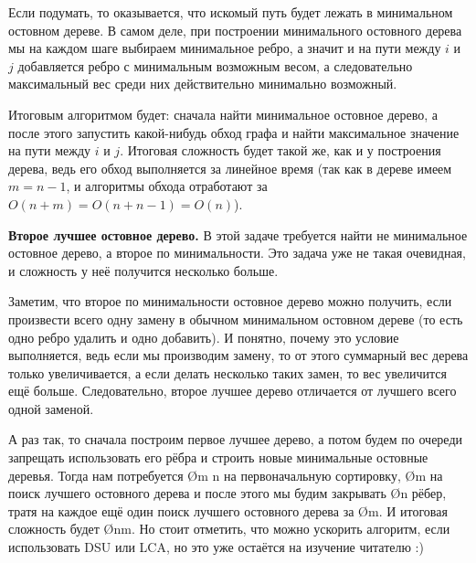 Если подумать, то оказывается, что искомый путь будет лежать в минимальном остовном дереве. В самом деле, при построении минимального остовного дерева мы на каждом шаге выбираем минимальное ребро, а значит и на пути между $i$ и $j$ добавляется ребро с минимальным возможным весом, а следовательно максимальный вес среди них действительно минимально возможный.

Итоговым алгоритмом будет: сначала найти минимальное остовное дерево, а после этого запустить какой-нибудь обход графа и найти максимальное значение на пути между $i$ и $j$. Итоговая сложность будет такой же, как и у построения дерева, ведь его обход выполняется за линейное время (так как в дереве имеем $m = n - 1$, и алгоритмы обхода отработают за $O(n + m) = O(n + n - 1) = O(n)$).

\textbf{Второе лучшее остовное дерево.} В этой задаче требуется найти не минимальное остовное дерево, а второе по минимальности. Это задача уже не такая очевидная, и сложность у неё получится несколько больше.

Заметим, что второе по минимальности остовное дерево можно получить, если произвести всего одну замену в обычном минимальном остовном дереве (то есть одно ребро удалить и одно добавить). И понятно, почему это условие выполняется, ведь если мы производим замену, то от этого суммарный вес дерева только увеличивается, а если делать несколько таких замен, то вес увеличится ещё больше. Следовательно, второе лучшее дерево отличается от лучшего всего одной заменой.

А раз так, то сначала построим первое лучшее дерево, а потом будем по очереди запрещать использовать его рёбра и строить новые минимальные остовные деревья. Тогда нам потребуется \O{m \log n} на первоначальную сортировку, \O{m} на поиск лучшего остовного дерева и после этого мы будим закрывать \O{n} рёбер, тратя на каждое ещё один поиск лучшего остовного дерева за \O{m}. И итоговая сложность будет \O{nm}. Но стоит отметить, что можно ускорить алгоритм, если использовать DSU или LCA, но это уже остаётся на изучение читателю :)
